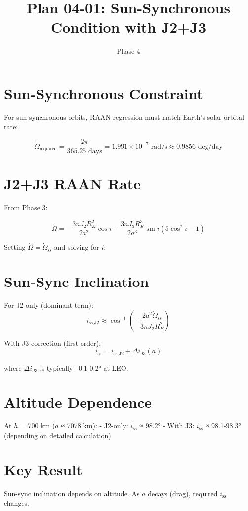 \documentclass[11pt]{article}
\title{Plan 04-01: Sun-Synchronous Condition with J2+J3}
\date{Phase 4}
\begin{document}
\maketitle

\section{Sun-Synchronous Constraint}

For sun-synchronous orbits, RAAN regression must match Earth's solar orbital rate:

$$\dot{\Omega}_{\text{required}} = \frac{2\pi}{365.25 \text{ days}} = 1.991 \times 10^{-7} \text{ rad/s} \approx 0.9856 \text{ deg/day}$$

\section{J2+J3 RAAN Rate}

From Phase 3:

$$\dot{\Omega} = -\frac{3 n J_2 R_E^2}{2 a^2}\cos i - \frac{3 n J_3 R_E^3}{2 a^3}\sin i(5\cos^2 i - 1)$$

Setting $\dot{\Omega} = \dot{\Omega}_{\text{ss}}$ and solving for $i$:

\section{Sun-Sync Inclination}

For J2 only (dominant term):
$$i_{\text{ss,J2}} \approx \cos^{-1}\left(-\frac{2a^2\dot{\Omega}_{\text{ss}}}{3nJ_2 R_E^2}\right)$$

With J3 correction (first-order):
$$\boxed{i_{\text{ss}} = i_{\text{ss,J2}} + \Delta i_{J3}(a)}$$

where $\Delta i_{J3}$ is typically ~0.1-0.2° at LEO.

\section{Altitude Dependence}

At $h$ = 700 km ($a$ ≈ 7078 km):
- J2-only: $i_{\text{ss}}$ ≈ 98.2°
- With J3: $i_{\text{ss}}$ ≈ 98.1-98.3° (depending on detailed calculation)

\section{Key Result}

Sun-sync inclination depends on altitude. As $a$ decays (drag), required $i_{\text{ss}}$ changes.
\end{document}
